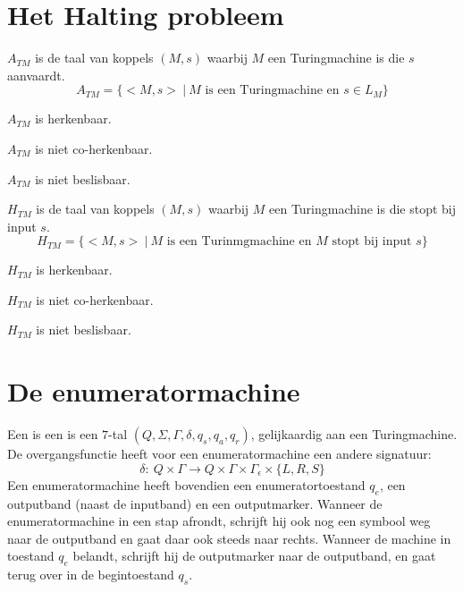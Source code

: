 \documentclass[main.tex]{subfiles}
\begin{document}
\section{Het Halting probleem}
\label{sec:het-halting-probleem}

\begin{de}
  $A_{TM}$ is de taal van koppels $(M,s)$ waarbij $M$ een Turingmachine is die $s$ aanvaardt.
  \[ A_{TM} = \{ <M,s> \ |\ M \text{ is een Turingmachine en } s \in L_{M} \} \]
\end{de}

\begin{st}
  $A_{TM}$ is herkenbaar.
\end{st}

\begin{st}
  $A_{TM}$ is niet co-herkenbaar.
\end{st}

\begin{gev}
  $A_{TM}$ is niet beslisbaar.
\end{gev}

\begin{de}
  $H_{TM}$ is de taal van koppels $(M,s)$ waarbij $M$ een Turingmachine is die stopt bij input $s$.
  \[ H_{TM} = \{ <M,s> \ |\ M \text{ is een Turinmgmachine en } M \text{ stopt bij input } s \} \]
\end{de}

\begin{st}
  $H_{TM}$ is herkenbaar.
\end{st}

\begin{st}
  $H_{TM}$ is niet co-herkenbaar.
\end{st}

\begin{gev}
  $H_{TM}$ is niet beslisbaar.

\end{gev}

\section{De enumeratormachine}
\label{sec:de-enumeratormachine}

\begin{de}
  Een  is een is een $7$-tal $(Q,\Sigma,\Gamma, \delta, q_{s}, q_{a}, q_{r})$, gelijkaardig aan een Turingmachine.
  De overgangsfunctie heeft voor een enumeratormachine een andere signatuur:
  \[ \delta:\ Q \times \Gamma \rightarrow Q \times \Gamma \times \Gamma_{\epsilon}\times \{L,R,S\} \]
  Een enumeratormachine heeft bovendien een enumeratortoestand $q_{e}$, een outputband (naast de inputband) en een outputmarker.
  Wanneer de enumeratormachine in een stap afrondt, schrijft hij ook nog een symbool weg naar de outputband en gaat daar ook steeds naar rechts. Wanneer de machine in toestand $q_{e}$ belandt, schrijft hij de outputmarker naar de outputband, en gaat terug over in de begintoestand $q_{s}$.
\end{de}
\end{document}
